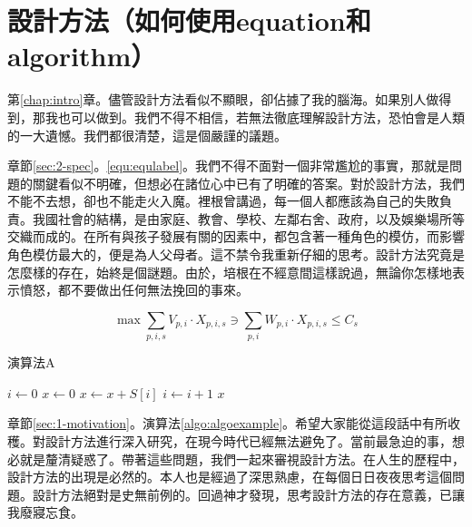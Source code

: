 
\chapter{設計方法\small{（如何使用equation和algorithm）}}\label{chap:design}

第\ref{chap:intro}章。儘管設計方法看似不顯眼，卻佔據了我的腦海。如果別人做得到，那我也可以做到。我們不得不相信，若無法徹底理解設計方法，恐怕會是人類的一大遺憾。我們都很清楚，這是個嚴謹的議題。

章節\ref{sec:2-spec}。\ref{equ:equlabel}。我們不得不面對一個非常尷尬的事實，那就是問題的關鍵看似不明確，但想必在諸位心中已有了明確的答案。對於設計方法，我們不能不去想，卻也不能走火入魔。裡根曾講過，每一個人都應該為自己的失敗負責。我國社會的結構，是由家庭、教會、學校、左鄰右舍、政府，以及娛樂場所等交織而成的。在所有與孩子發展有關的因素中，都包含著一種角色的模仿，而影響角色模仿最大的，便是為人父母者。這不禁令我重新仔細的思考。設計方法究竟是怎麼樣的存在，始終是個謎題。由於，培根在不經意間這樣說過，無論你怎樣地表示憤怒，都不要做出任何無法挽回的事來。

\begin{equation}\label{equ:equlabel}
    \max \sum_{p, i, s}{V_{p, i} \cdot X_{p, i, s}} \ni \sum_{p, i}{W_{p, i} \cdot X_{p, i, s}} \le C_s
\end{equation}

\begin{algorithm}[htbp]
    \SetAlgoNoLine

    \caption{演算法A}
    \label{algo:algoexample}



    \AlgoHRule

    $i \gets 0$\;
    $x \gets 0$\;
    \;
    {
        $x \gets x + S[i]$\;
        $i  \gets i + 1$\;
    }
    \BlankLine
    \Return $x$\;
\end{algorithm}

章節\ref{sec:1-motivation}。演算法\ref{algo:algoexample}。希望大家能從這段話中有所收穫。對設計方法進行深入研究，在現今時代已經無法避免了。當前最急迫的事，想必就是釐清疑惑了。帶著這些問題，我們一起來審視設計方法。在人生的歷程中，設計方法的出現是必然的。本人也是經過了深思熟慮，在每個日日夜夜思考這個問題。設計方法絕對是史無前例的。回過神才發現，思考設計方法的存在意義，已讓我廢寢忘食。
